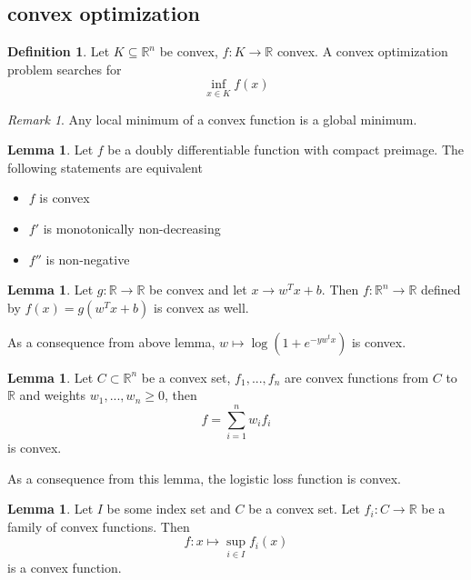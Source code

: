 \documentclass[a4paper, 12pt]{article}
\theoremstyle{plain}
\theoremstyle{definition}
\newtheorem{definition}[theorem]{Definition} %
\theoremstyle{lemma}
\newtheorem{lemma}[theorem]{Lemma}
\theoremstyle{remark}
\newtheorem{remark}[theorem]{Remark}
\theoremstyle{example}
\begin{document}
	\subsection{convex optimization}
	\begin{definition}
		Let $K\subseteq \mathbb{R}^n$ be convex, $f: K \to \mathbb{R}$ convex. A convex optimization problem searches for \[\inf_{x\in K} f(x)\]
	\end{definition}
	\begin{remark}
		Any local minimum of a convex function is a global minimum.
	\end{remark}
	\begin{lemma}
		Let $f$ be a doubly differentiable function with compact preimage. The following statements are equivalent
		\begin{itemize}
			\item $f$ is convex
			\item $f'$ is monotonically non-decreasing
			\item $f''$ is non-negative
		\end{itemize}
	\end{lemma}
	\begin{lemma}
		Let $g: \mathbb{R} \to \mathbb{R}$ be convex and let $x \to w^Tx+b$. Then $f: \mathbb{R}^n \to \mathbb{R}$ defined by $f(x) = g(w^Tx+b)$ is convex as well.
	\end{lemma}
	As a consequence from above lemma, $w \mapsto \log(1+e^{-yw^tx})$ is convex.
	\begin{lemma}
		Let $C\subset \mathbb{R}^n$ be a convex set, $f_1,...,f_n$ are convex functions from $C$ to $\mathbb{R}$ and weights $w_1,...,w_n \geq 0$, then \[f= \sum_{i=1}^n w_if_i\] is convex.
	\end{lemma}
	As a consequence from this lemma, the logistic loss function is convex.
	\begin{lemma}
		Let $I$ be some index set and $C$ be a convex set. Let $f_i: C \to \mathbb{R}$ be a family of convex functions. Then \[f:x\mapsto \sup_{i\in I} f_i(x)\] is a convex function.
	\end{lemma}
\end{document}
